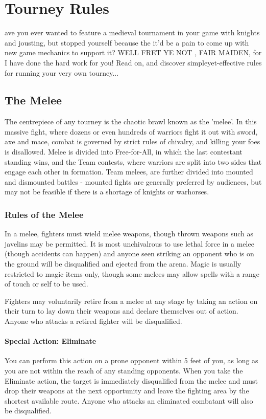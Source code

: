 \documentclass[10pt,a4paper,twoside,bg=print,twocolumn,openany,nodeprecatedcode]{dndbook}
\date{}
\begin{document}
\frontmatter
\tableofcontents
\mainmatter
\chapter{Tourney Rules}
ave you ever wanted to feature a medieval tournament in your game with knights and jousting, but stopped yourself because the it'd be a pain to come up with new game mechanics to support it? WELL FRET YE NOT , FAIR MAIDEN, for I have done the hard work for you! Read on, and discover simpleyet-effective rules for running your very own tourney...


\section{The Melee}
The centrepiece of any tourney is the chaotic brawl known as the 'melee'. In this massive fight, where dozens or even hundreds of warriors fight it out with sword, axe and mace, combat is governed by strict rules of chivalry, and killing your foes is disallowed. Melee is divided into Free-for-All, in which the last contestant standing wins, and the Team contests, where warriors are split into two sides that engage each other in formation. Team melees, are further divided into mounted and dismounted battles - mounted fights are generally preferred by audiences, but may not be feasible if there is a shortage of knights or warhorses.

\subsection{Rules of the Melee}
In a melee, fighters must wield melee weapons, though thrown weapons such as javelins may be permitted. It is most unchivalrous to use lethal force in a melee (though accidents can happen) and anyone seen striking an opponent who is on the ground will be disqualified and ejected from the arena. Magic is usually restricted to magic items only, though some melees may allow spells with a range of touch or self to be used.

Fighters may voluntarily retire from a melee at any stage by taking an action on their turn to lay down their weapons and declare themselves out of action. Anyone who attacks a retired fighter will be disqualified.

\subsubsection{Special Action: Eliminate}
You can perform this action on a prone opponent within 5 feet of you, as long as you are not within the reach of any standing opponents. When you take the Eliminate action, the target is immediately disqualified from the melee and must drop their weapons at the next opportunity and leave the fighting area by the shortest available route. Anyone who attacks an eliminated combatant will also be disqualified.
\end{document}
